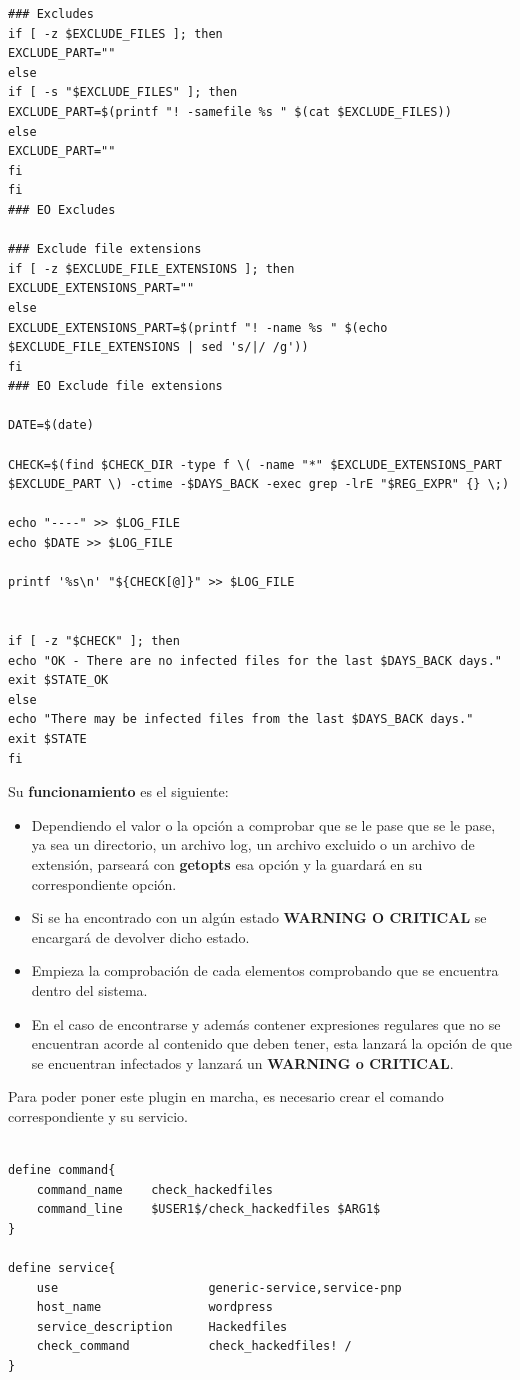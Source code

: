 \begin{lstlisting}
### Excludes
if [ -z $EXCLUDE_FILES ]; then
EXCLUDE_PART=""
else
if [ -s "$EXCLUDE_FILES" ]; then 
EXCLUDE_PART=$(printf "! -samefile %s " $(cat $EXCLUDE_FILES))
else
EXCLUDE_PART=""
fi
fi
### EO Excludes

### Exclude file extensions
if [ -z $EXCLUDE_FILE_EXTENSIONS ]; then
EXCLUDE_EXTENSIONS_PART=""
else
EXCLUDE_EXTENSIONS_PART=$(printf "! -name %s " $(echo $EXCLUDE_FILE_EXTENSIONS | sed 's/|/ /g'))
fi
### EO Exclude file extensions

DATE=$(date)

CHECK=$(find $CHECK_DIR -type f \( -name "*" $EXCLUDE_EXTENSIONS_PART $EXCLUDE_PART \) -ctime -$DAYS_BACK -exec grep -lrE "$REG_EXPR" {} \;)

echo "----" >> $LOG_FILE
echo $DATE >> $LOG_FILE

printf '%s\n' "${CHECK[@]}" >> $LOG_FILE


if [ -z "$CHECK" ]; then
echo "OK - There are no infected files for the last $DAYS_BACK days."
exit $STATE_OK
else
echo "There may be infected files from the last $DAYS_BACK days."
exit $STATE
fi

\end{lstlisting}
\newpage
Su \textbf{funcionamiento} es el siguiente:

\begin{itemize}
	\item Dependiendo el valor o la opción a comprobar que se le pase que se le pase, ya sea un directorio, un archivo log, un archivo excluido o un archivo de extensión, parseará con \textbf{getopts} esa opción y la guardará en su correspondiente opción.
	\item Si se ha encontrado con un algún estado \textbf{WARNING O CRITICAL} se encargará de devolver dicho estado.
	\item Empieza la comprobación de cada elementos comprobando que se encuentra dentro del sistema.
	\item En el caso de encontrarse y además contener expresiones regulares que no se encuentran acorde al contenido que deben tener, esta lanzará la opción de que se encuentran infectados y lanzará un \textbf{WARNING o CRITICAL}.
\end{itemize}

Para poder poner este plugin en marcha, es necesario crear el comando correspondiente y su servicio.

\begin{lstlisting}

define command{
	command_name    check_hackedfiles
	command_line    $USER1$/check_hackedfiles $ARG1$
}

define service{
	use                     generic-service,service-pnp    
	host_name               wordpress
	service_description     Hackedfiles
	check_command           check_hackedfiles! /
}

\end{lstlisting}

